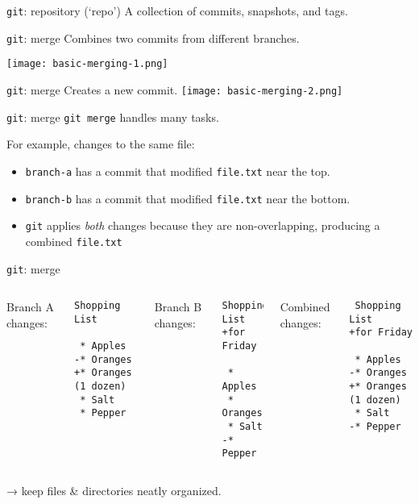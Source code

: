 \documentclass[12pt,aspectratio=169]{beamer}
\begin{document}
\begin{frame}{\texttt{git}: repository (‘repo’)} \Large
\centering A collection of commits, snapshots, and tags.
\end{frame}

\begin{frame}{\texttt{git}: merge} \Large
Combines two commits from different branches.

\texttt{[image: basic-merging-1.png]}
\end{frame}

\begin{frame}{\texttt{git}: merge} \Large
Creates a new commit.
\texttt{[image: basic-merging-2.png]}
\end{frame}

\begin{frame}{\texttt{git}: merge} \large
\texttt{git merge}  handles many tasks.

\bigskip
For example, changes to the same file:

\begin{itemize}
  \item \texttt{branch-a} has a commit that modified \texttt{file.txt} near the top.
  \item \texttt{branch-b} has a commit that modified \texttt{file.txt} near the bottom.
  \item \texttt{git} applies \emph{both} changes because they are non-overlapping, producing a combined \texttt{file.txt}
\end{itemize}
\end{frame}

\begin{frame}[fragile]{\texttt{git}: merge}
\begin{columns}[t]
\column{0.3\paperwidth}
Branch A changes:

\begin{verbatim}
Shopping List

 * Apples
-* Oranges
+* Oranges (1 dozen)
 * Salt
 * Pepper
\end{verbatim}

\column{0.3\paperwidth}
Branch B changes:

\begin{verbatim}
Shopping List
+for Friday

 * Apples
 * Oranges
 * Salt
-* Pepper
\end{verbatim}

\column{0.3\paperwidth}
Combined changes:

\begin{verbatim}
 Shopping List
+for Friday

 * Apples
-* Oranges
+* Oranges (1 dozen)
 * Salt
-* Pepper
\end{verbatim}

\end{columns}

→ keep files \& directories neatly organized.
\end{frame}
\end{document}
